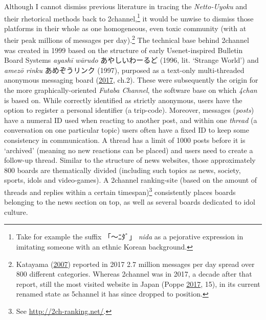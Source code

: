 \documentclass[10pt,british,A4paper,,openany]{memoir}
\begin{document}
Although I cannot dismiss previous literature in tracing the
\emph{Netto-Uyoku} and their rhetorical methods back to
2channel,\footnote{Take for example the suffix 「～ﾆﾀﾞ」 \emph{nida} as
  a pejorative expression in imitating someone with an ethnic Korean
  background.} it would be unwise to dismiss those platforms in their
whole as one homogeneous, even toxic community (with at their peak
millions of messages per day).\footnote{Katayama
  (\protect\hyperlink{ref-katayama_2-channel_2007}{2007}) reported in
  2017 2.7 million messages per day spread over 800 different
  categories. Whereas 2channel was in 2017, a decade after that report,
  still the  most visited website in Japan (Poppe
  \protect\hyperlink{ref-poppe_digitaal_2017}{2017}, 15), in its current
  renamed state as 5channel it has since dropped to  position.}
The technical base behind 2channel was created in 1999 based on the
structure of early Usenet-inspired Bulletin Board Systems \emph{ayashī
wārudo} あやしいわーるど (1996, lit. `Strange World') and \emph{amezō
rinku} あめぞうリンク (1997), purposed as a text-only multi-threaded
anonymous messaging board
(\protect\hyperlink{ref-barubora_eng:_2017}{2017}, ch.2). These were
subsequently the origin for the more graphically-oriented \emph{Futaba
Channel}, the software base on which \emph{4chan} is based on. While
correctly identified as strictly anonymous, users have the option to
register a personal identifier (a trip-code). Moreover, messages
(\emph{posts}) have a numeral ID used when reacting to another post, and
within one \emph{thread} (a conversation on one particular topic) users
often have a fixed ID to keep some consistency in communication. A
thread has a limit of 1000 posts before it is `archived' (meaning no new
reactions can be placed) and users need to create a follow-up thread.
Similar to the structure of news websites, those approximately 800
boards are thematically divided (including such topics as news, society,
sports, idols and video-games). A 2channel ranking-site (based on the
amount of threads and replies within a certain timespan)\footnote{See
  \url{http://2ch-ranking.net/}.} consistently places boards belonging
to the news section on top, as well as several boards dedicated to idol
culture.
\end{document}
